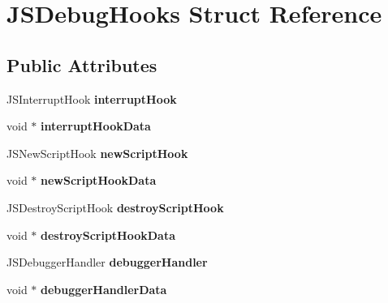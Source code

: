 \hypertarget{struct_j_s_debug_hooks}{\section{J\-S\-Debug\-Hooks Struct Reference}
\label{struct_j_s_debug_hooks}
}
\subsection*{Public Attributes}
\begin{DoxyCompactItemize}
\item 
\hypertarget{struct_j_s_debug_hooks_a4be1f28e900c1127b41e3c0ae8a37eef}{J\-S\-Interrupt\-Hook {\bfseries interrupt\-Hook}}\label{struct_j_s_debug_hooks_a4be1f28e900c1127b41e3c0ae8a37eef}

\item 
\hypertarget{struct_j_s_debug_hooks_a3efedd7c51b3a6fa56a0810303fa7187}{void $\ast$ {\bfseries interrupt\-Hook\-Data}}\label{struct_j_s_debug_hooks_a3efedd7c51b3a6fa56a0810303fa7187}

\item 
\hypertarget{struct_j_s_debug_hooks_a0985a15f78a49f30de7f6f6ad7d9e3e0}{J\-S\-New\-Script\-Hook {\bfseries new\-Script\-Hook}}\label{struct_j_s_debug_hooks_a0985a15f78a49f30de7f6f6ad7d9e3e0}

\item 
\hypertarget{struct_j_s_debug_hooks_ac5a9e35b2afef7d4c031138f7ee1e4b1}{void $\ast$ {\bfseries new\-Script\-Hook\-Data}}\label{struct_j_s_debug_hooks_ac5a9e35b2afef7d4c031138f7ee1e4b1}

\item 
\hypertarget{struct_j_s_debug_hooks_ab6181e610b84a666d99fda502eaaa5a9}{J\-S\-Destroy\-Script\-Hook {\bfseries destroy\-Script\-Hook}}\label{struct_j_s_debug_hooks_ab6181e610b84a666d99fda502eaaa5a9}

\item 
\hypertarget{struct_j_s_debug_hooks_a4df32770e8cf66c77f82e03b0075a6b7}{void $\ast$ {\bfseries destroy\-Script\-Hook\-Data}}\label{struct_j_s_debug_hooks_a4df32770e8cf66c77f82e03b0075a6b7}

\item 
\hypertarget{struct_j_s_debug_hooks_aa809b261de188dbb827d4086626b636c}{J\-S\-Debugger\-Handler {\bfseries debugger\-Handler}}\label{struct_j_s_debug_hooks_aa809b261de188dbb827d4086626b636c}

\item 
\hypertarget{struct_j_s_debug_hooks_a3ef840df59ffaa0f3890b62254a3d582}{void $\ast$ {\bfseries debugger\-Handler\-Data}}\label{struct_j_s_debug_hooks_a3ef840df59ffaa0f3890b62254a3d582}


\end{DoxyCompactItemize}
